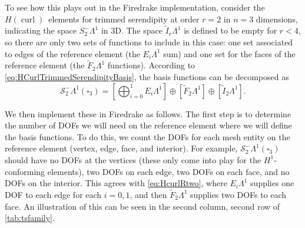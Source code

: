 \documentclass[format=acmsmall,screen,timestamp=false,a4paper]{acmart}
\DeclareMathOperator{\curl}{curl}
\newcommand\josh[1]{\textbf{\textcolor[rgb]{0,.5,1}{[Josh: #1]}}}
\newcommand\lm[1]{\textbf{\textcolor[rgb]{1,0,0.5}{[Lawrence: #1]}}}
\newcommand{\calS}{\mathcal{S}}
\newcommand{\hcurl}{\ensuremath{{H}(\curl)}\xspace}
\begin{document}

To see how this plays out in the Firedrake implementation, consider the \hcurl~elements for trimmed serendipity at order $r=2$ in $n=3$ dimensions, indicating the space $S_2^- \Lambda^1$ in 3D.
The space $\tilde{I}_r \Lambda^1$ is defined to be empty for $r<4$, so there are only two sets of functions to include in this case: one set associated to edges of the reference element (the $E_i\Lambda^1$ sum) and one set for the faces of the reference element (the $\tilde{F}_2\Lambda^1$ functions).
According to \cref{eq:HCurlTrimmedSerendipityBasis}, the basis functions can be decomposed as
\begin{equation}\label{eq:HcurlRtwo}
   \calS^-_2\Lambda^1(\square_3) =    \left[\bigoplus_{i=0}^{1} E_i \Lambda^1\right] \oplus \left[\tilde{F}_2 \Lambda^1\right]\oplus \left[\tilde{I}_2 \Lambda^1\right].
   \end{equation}

We then implement these in Firedrake as follows.  The first step is to determine the number of DOFs we will need on the reference element where we will define the basis functions.  To do this, we count the DOFs for each mesh entity on the reference element (vertex, edge, face, and interior).  For example, $\mathcal{S}_2^- \Lambda^1(\square_3)$ should have no DOFs at the vertices (these only come into play for the $H^1$-conforming elements), two DOFs on each edge, two DOFs on each face, and no DOFs on the interior.  This agrees with \cref{eq:HcurlRtwo}, where $E_i\Lambda^1$ supplies one DOF to each edge for each $i=0, 1$, and then $\tilde{F}_2\Lambda^1$ supplies two DOFs to each face.  An illustration of this can be seen in the second column, second row of \cref{tab:tsfamily}.
\end{document}
